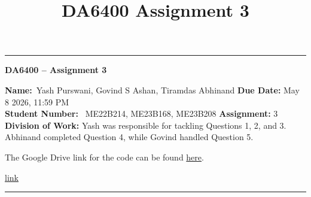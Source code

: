 \documentclass[12pt]{scrartcl}
\title{DA6400 Assignment 3}
\begin{document}
\begin{center}
	\hrule
	\vspace{.4cm}
	{\textbf { \large DA6400 -- Assignment 3}}
\end{center}
{\textbf{Name:}\ Yash Purswani, Govind S Ashan, Tiramdas Abhinand \hspace{\fill} \textbf{Due Date:} May 8 2026, 11:59 PM   \\
{ \textbf{Student Number:}} \ ME22B214, ME23B168, ME23B208 \hspace{\fill} \textbf{Assignment:} 3 \\

\noindent \textbf{Division of Work:} Yash was responsible for tackling Questions 1, 2, and 3. Abhinand completed Question 4, while Govind handled Question 5.

\noindent The Google Drive link for the code can be found \href{link}{here}.

\url{link}}
\hrule

\end{document}
